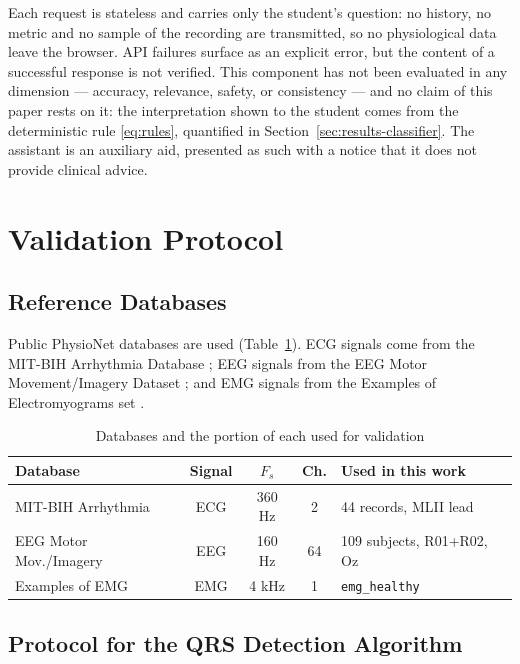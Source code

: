 \documentclass[conference]{IEEEtran}
\begin{document}
Each request is stateless and carries only the student's question: no history, no metric and no sample of the recording are transmitted, so no physiological data leave the browser. API failures surface as an explicit error, but the content of a successful response is not verified. This component has not been evaluated in any dimension --- accuracy, relevance, safety, or consistency --- and no claim of this paper rests on it: the interpretation shown to the student comes from the deterministic rule \eqref{eq:rules}, quantified in Section~\ref{sec:results-classifier}. The assistant is an auxiliary aid, presented as such with a notice that it does not provide clinical advice.

\section{Validation Protocol}
\label{sec:protocol}

\subsection{Reference Databases}

Public PhysioNet databases are used (Table~\ref{tab:datasets}). ECG signals come from the MIT-BIH Arrhythmia Database \cite{932724}; EEG signals from the EEG Motor Movement/Imagery Dataset \cite{PhysioNet-eegmmidb-1.0.0}; and EMG signals from the Examples of Electromyograms set \cite{Goldberger2000PhysioNet}.

\begin{table}[!t]
\caption{Databases and the portion of each used for validation}
\centering
\setlength{\tabcolsep}{4pt}
\begin{tabular}{lcccl}
\hline
Database & Signal & $F_s$ & Ch. & Used in this work\\
\hline
MIT-BIH Arrhythmia & ECG & 360 Hz & 2 & 44 records, MLII lead\\
EEG Motor Mov./Imagery & EEG & 160 Hz & 64 & 109 subjects, R01+R02, Oz\\
Examples of EMG & EMG & 4 kHz & 1 & \texttt{emg\_healthy}\\
\hline
\end{tabular}
\label{tab:datasets}
\end{table}

\subsection{Protocol for the QRS Detection Algorithm}
\label{sec:protocol-qrs}
\end{document}
